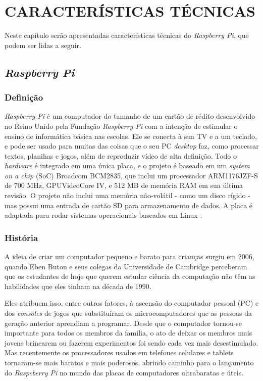 \chapter{CARACTERÍSTICAS TÉCNICAS}

Neste capítulo serão apresentadas características técnicas do \textit{Raspberry Pi}, que podem ser lidas a seguir.

\section{\textit{Raspberry Pi}}

\subsection{Definição}

\textit{Raspberry Pi} é um computador do tamanho de um cartão de  rédito desenvolvido no Reino Unido pela Fundação \textit{Raspberry Pi} com a intenção de estimular o ensino de informática básica nas escolas. Ele se conecta à sua TV e a um teclado, e pode ser usado para muitas das coisas que o seu PC \textit{desktop} faz, como processar textos, planihas e jogos, além de reproduzir vídeo de alta definição. Todo o \textit{hardware} é integrado em uma única placa, e o projeto é baseado em um \textit{system on a chip} (SoC) Broadcom BCM2835, que inclui um processador ARM1176JZF-S de 700 MHz, GPUVideoCore IV, e 512 MB de memória RAM em sua última revisão. O projeto não inclui uma memória não-volátil - como um disco rígido - mas possui uma entrada de cartão SD para armazenamento de dados. A placa é adaptada para rodar sistemas operacionais baseados em Linux \cite{WIKIPEDIA2}.

\subsection{História}

A ideia de criar um computador pequeno e barato para crianças surgiu em 2006, quando Eben Buton e seus colegas da Universidade de Cambridge perceberam que os estudantes de hoje que querem estudar ciência da computação não têm as habilidades que eles tinham na década de 1990.

Eles atribuem isso, entre outros fatores, à ascensão do computador pessoal (PC) e dos \textit{consoles} de jogos que substituíram os microcomputadores que as pessoas da geração anterior aprendiam a programar. Desde que o computador tornou-se importante para todos os membros da família, o ato de deixar os membros mais jovens brincarem ou fazerem experimentos foi sendo cada vez mais desestimulado.
Mas recentemente os processadores usados em telefones celulares e tablets tornaram-se mais baratos e mais poderosos, abrindo caminho para o lançamento do \textit{Raspeberry Pi} no mundo das placas de computadores ultrabaratas e úteis.

